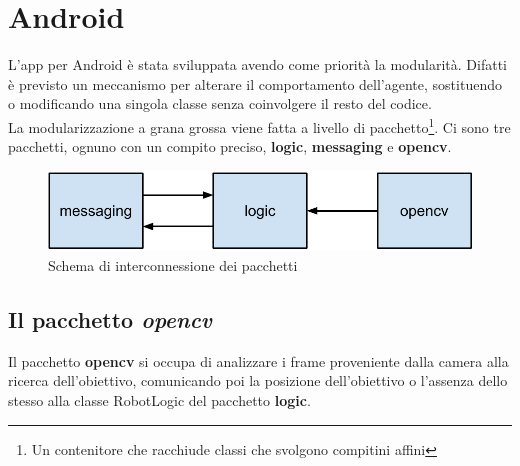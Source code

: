 \section {Android}
L'app per Android è stata sviluppata avendo come priorità la modularità. 
Difatti è previsto un meccanismo per alterare il comportamento dell'agente, 
sostituendo o modificando una singola classe senza coinvolgere il resto del codice.\\
La modularizzazione a grana grossa viene fatta a livello di pacchetto\footnote{Un contenitore 
che racchiude classi che svolgono compitini affini}. Ci sono tre pacchetti,
ognuno con un compito preciso, \textbf{logic}, \textbf{messaging} e \textbf{opencv}.
\begin{figure}[H] \center
\includegraphics[width=\textwidth]{immagini/interconnessione_pacchetti.pdf}
\caption{Schema di interconnessione dei pacchetti} 
\end{figure}

\subsection {Il pacchetto \textit{opencv}}
Il pacchetto \textbf{opencv} si occupa di analizzare 
i frame proveniente dalla camera alla ricerca dell'obiettivo, comunicando poi la posizione 
dell'obiettivo o l'assenza dello stesso alla classe RobotLogic del pacchetto 
\textbf{logic}.

